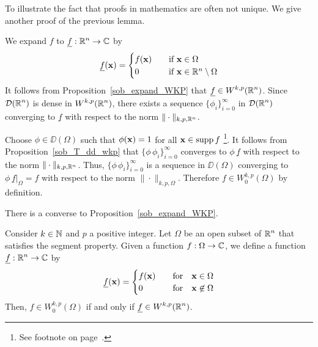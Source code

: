 \begin{rmk}
To illustrate the fact that proofs in mathematics are often not unique.
We give another proof of the previous lemma.

We expand $f$ to $\displaystyle \underline{f}:\mathbb{R}^n\rightarrow \mathbb{C}$ by
\[
\underline{f}(\mathbf{x}) =
\begin{cases}
f(\mathbf{x}) & \quad \text{if} \ \mathbf{x} \in \Omega \\
0 & \quad \text{if} \ \mathbf{x} \in \mathbb{R}^n \setminus \Omega
\end{cases}
\]
It follows from Proposition~\ref{sob_expand_WKP} that
$\displaystyle \underline{f} \in W^{k,p}(\mathbb{R}^n)$.  Since
$\displaystyle \mathcal{D}(\mathbb{R}^n)$
is dense in $\displaystyle W^{k,p}(\mathbb{R}^n)$, there exists a sequence
$\displaystyle \{\phi_i\}_{i=0}^\infty$ in 
$\displaystyle \mathcal{D}(\mathbb{R}^n)$ converging to $\underline{f}$ with respect
to the norm $\displaystyle \|\cdot\|_{k,p,\mathbb{R}^n}$.

Choose $\phi \in \DD(\Omega)$ such that
$\phi(\mathbf{x}) = 1$ for all $\mathbf{x} \in \operatorname{supp} f$ \footnote{
See footnote on page~\pageref{FOOTNOTE1}.}.
It follows from Proposition~\ref{sob_T_dd_wkp} that
$\displaystyle \{\phi \, \phi_i\}_{i=0}^\infty$
converges to $\phi \,\underline{f}$ with respect to the norm
$\|\cdot\|_{k,p,\mathbb{R}^n}$.  Thus,
$\displaystyle \{\phi \, \phi_i\}_{i=0}^\infty$
is a sequence in $\DD(\Omega)$ converging to
$\displaystyle \phi \,\underline{f}\big|_{\Omega} = f$ with respect to the norm
$\|\cdot\|_{k,p,\Omega}$.  Therefore
$\displaystyle f\in W^{k,p}_0(\Omega)$ by definition.
\end{rmk}

There is a converse to Proposition~\ref{sob_expand_WKP}.

\begin{prop} \label{sob_expand_WKP_Conv}
Consider $k\in \mathbb{N}$ and $p$ a positive integer.  Let $\Omega$ be an
open subset of $\displaystyle \mathbb{R}^n$ that satisfies the segment
property.  Given a function $f:\Omega \rightarrow \mathbb{C}$,
we define a function $\displaystyle \underline{f}:\mathbb{R}^n\rightarrow \mathbb{C}$ by
\[
\underline{f}(\mathbf{x}) =
\begin{cases}
f(\mathbf{x}) & \quad \text{for} \quad \mathbf{x} \in \Omega \\
0 & \quad \text{for} \quad \mathbf{x} \not\in \Omega \\
\end{cases}
\]
Then, $\displaystyle f \in W^{k,p}_0(\Omega)$ if and only if
$\displaystyle \underline{f} \in W^{k,p}(\mathbb{R}^n)$.
\end{prop}

